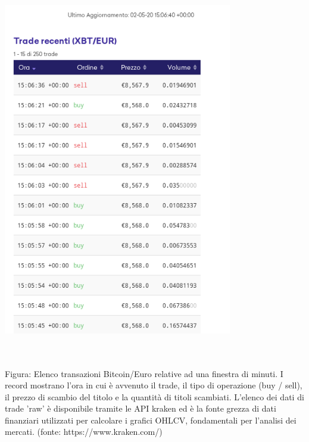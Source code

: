 \documentclass[a4paper,12pt]{report}
\begin{document}
\begin{fig}
\begin{center}
		\includegraphics[width=10cm]{kraken_raw}
\end{center}
		\caption{\\~\\Figura: Elenco transazioni Bitcoin/Euro relative ad una finestra di minuti. I record mostrano l'ora in cui è avvenuto il trade, il tipo di operazione (buy / sell), il prezzo di scambio del titolo e la quantità di titoli scambiati. L'elenco dei dati di trade 'raw' è disponibile tramite le API kraken ed è la fonte grezza di dati finanziari utilizzati per calcolare i grafici OHLCV, fondamentali per l'analisi dei mercati. (fonte: https://www.kraken.com/)}
\end{fig}
\end{document}
